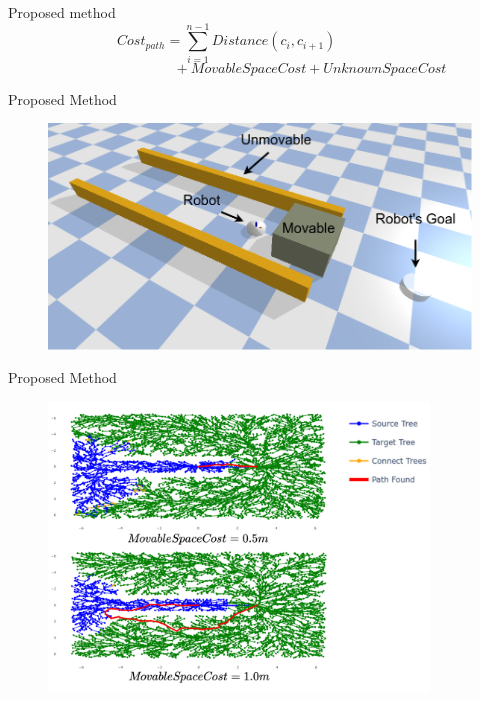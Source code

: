 \begin{frame}[fragile]{Proposed method} 
  \[\mathit{Cost_{path}} =  \sum_{i=1}^{n-1} \mathit{Distance}(c_i, c_{i+1}) \hspace{2cm}\]
  \[\hspace{3cm}+ \mathit{MovableSpaceCost} + \mathit{UnknownSpaceCost} \]
\end{frame}

\begin{frame}[fragile]{Proposed Method} 
\begin{center}
\begin{figure}[H]
\includegraphics[width=\textwidth]{figures/proposed_method/push_or_drive}
\end{figure}
\end{center}

\end{frame}

\begin{frame}[fragile]{Proposed Method}
\begin{center}
\begin{figure}[H]
\vspace{-0.2cm}
\includegraphics[width=0.90\textwidth]{figures/proposed_method/push_or_drive_planned.drawio.png} 
\end{figure}
\end{center}
\end{frame}
